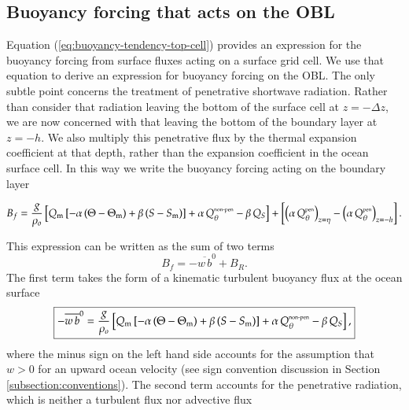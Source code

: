 \subsection{Buoyancy forcing that acts on the OBL}
\label{subsection:buoyancy-forcing-obl}

Equation (\ref{eq:buoyancy-tendency-top-cell}) provides an expression
for the buoyancy forcing from surface fluxes acting on a surface grid
cell.  We use that equation to derive an expression for buoyancy
forcing on the OBL.  The only subtle point concerns the treatment of
penetrative shortwave radiation.  Rather than consider that radiation
leaving the bottom of the surface cell at $z=-\Delta z$, we are now
concerned with that leaving the bottom of the boundary layer at
$z=-h$.  We also multiply this penetrative flux by the thermal
expansion coefficient at that depth, rather than the expansion
coefficient in the ocean surface cell.  In this way we write the
buoyancy forcing acting on the boundary layer
\begin{mdframed}[backgroundcolor=lightgray!50]
\begin{equation}
B_{f} =  \frac{g}{\rho_{o}} 
  \left[ 
 Q_{\mbox{\scriptsize m}} \, [ -\alpha \, (\Theta - \Theta_{\mbox{\scriptsize m}}) +  \beta \, (S - S_{\mbox{\scriptsize m}}) ]
  +\alpha \,  Q_{\theta}^{\mbox{\tiny non-pen}} - \beta \, Q_{S} 
  \right]
+ \left[ 
    \left( \alpha \, Q_{\theta}^{\mbox{\tiny pen}} \right)_{z=\eta}
 - \left( \alpha \, Q_{\theta}^{\mbox{\tiny pen}} \right)_{z=-h}
 \right].
\label{eq:buoyancy-forcing-obl}
\end{equation}
\end{mdframed}
This expression can be written as the sum of two terms
\begin{equation}
 B_{f} =  -\overline{w \, b}^{0}  + B_{R}. 
\label{eq:buoyancy-forcing-kpp}
\end{equation}
The first term takes the form of a kinematic turbulent buoyancy flux
at the ocean surface
\begin{equation}
\boxed{
 -\overline{w \, b}^{0} =  
  \frac{g}{\rho_{o}} 
  \left[ 
 Q_{\mbox{\scriptsize m}} \, [ -\alpha \, (\Theta - \Theta_{\mbox{\scriptsize m}}) +  \beta \, (S - S_{\mbox{\scriptsize m}}) ]
  +\alpha \,  Q_{\theta}^{\mbox{\tiny non-pen}} - \beta \, Q_{S} 
 \right],
\label{eq:surface-turbulent-kinematic-flux}
}
\end{equation}
where the minus sign on the left hand side accounts for the assumption
that $w > 0$ for an upward ocean velocity (see sign convention
discussion in Section \ref{subsection:conventions}).  The second term
accounts for the penetrative radiation, which is neither a turbulent
flux nor advective flux
